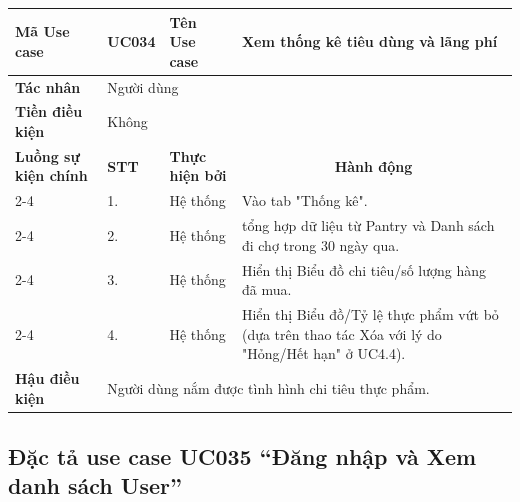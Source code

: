 \documentclass[../main.tex]{subfiles}
\begin{document}
\begin{longtable}{|p{2.7cm}|p{0.8cm}|p{2.6cm}|p{7.3cm}|}
\hline
\cellcolor[HTML]{D5F5E3}\textbf{Mã Use case} & \multicolumn{1}{l|}{UC034} & \cellcolor[HTML]{D5F5E3}\textbf{Tên Use case} & Xem thống kê tiêu dùng và lãng phí \\ \hline
\cellcolor[HTML]{D5F5E3}\textbf{Tác nhân} & \multicolumn{3}{p{10.7cm}|}{Người dùng} \\ \hline
\cellcolor[HTML]{D5F5E3}\textbf{Tiền điều kiện} & \multicolumn{3}{p{10.7cm}|}{Không} \\ \hline

\cellcolor[HTML]{D5F5E3}\textbf{Luồng sự kiện chính} & \cellcolor[HTML]{FDEBD0}\textbf{STT} & \cellcolor[HTML]{FDEBD0}\textbf{Thực hiện bởi} & \multicolumn{1}{c|}{\cellcolor[HTML]{FDEBD0}\textbf{Hành động}} \\ \cline{2-4} 
\cellcolor[HTML]{D5F5E3} & 1. & Hệ thống & Vào tab "Thống kê". \\ \cline{2-4} 
\cellcolor[HTML]{D5F5E3} & 2. & Hệ thống & tổng hợp dữ liệu từ Pantry và Danh sách đi chợ trong 30 ngày qua. \\ \cline{2-4} 
\cellcolor[HTML]{D5F5E3} & 3. & Hệ thống & Hiển thị Biểu đồ chi tiêu/số lượng hàng đã mua. \\ \cline{2-4} 
\cellcolor[HTML]{D5F5E3} & 4. & Hệ thống & Hiển thị Biểu đồ/Tỷ lệ thực phẩm vứt bỏ (dựa trên thao tác Xóa với lý do "Hỏng/Hết hạn" ở UC4.4). \\ \hline

\cellcolor[HTML]{D5F5E3}\textbf{Hậu điều kiện} & \multicolumn{3}{p{10.7cm}|}{Người dùng nắm được tình hình chi tiêu thực phẩm.} \\ \hline
\end{longtable}
\endgroup

\subsection{Đặc tả use case UC035 ``Đăng nhập và Xem danh sách User''}
\vspace{0.5cm}

\begingroup
\renewcommand{\arraystretch}{1.5}
\end{document}
